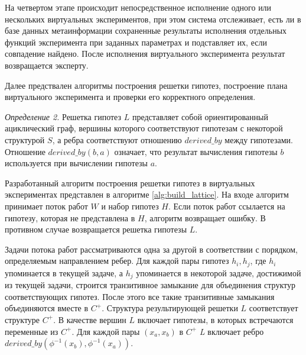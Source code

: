 На четвертом этапе происходит непосредственное исполнение одного или нескольких виртуальных экспериментов, при этом 
система отслеживает, есть ли в базе данных метаинформации сохраненные результаты исполнения отдельных функций 
эксперимента при заданных параметрах и подставляет их, если совпадение найдено. После исполнения виртуального 
эксперимента результат возвращается эксперту. 

Далее предствален алгоритмы построения решетки гипотез, построение плана виртуального эксперимента и 
проверки его корректного определения. 

\textit{Определение 2.} Решетка гипотез $L$ представляет собой ориентированный ациклический граф, вершины которого 
соответствуют гипотезам с некоторой структурой $S$, а ребра соответствуют отношению $derived\_by$  между гипотезами. 
Отношение $derived\_ by\left(b, a\right)$ означает, что результат вычисления гипотезы $b$ используется при вычислении 
гипотезы $a$.

Разработанный алгоритм построения решетки гипотез в виртуальных экспериментах представлен в алгоритме
\ref{alg:build_lattice}. На входе алгоритм принимает поток работ $W$ и набор гипотез $H$. 
Если поток работ ссылается на гипотезу, которая не представлена в $H$, алгоритм возвращает ошибку. 
В противном случае возвращается решетка гипотезы $L$.  

Задачи потока работ рассматриваются одна за другой в соответствии с порядком, определяемым направлением ребер. 
Для каждой пары гипотез $h_i, h_j$, где $h_i$ упоминается в текущей задаче, а $h_j$ упоминается в некоторой задаче, 
достижимой из текущей задачи, строится транзитивное замыкание для объединения структур соответствующих гипотез. 
После этого все такие транзитивные замыкания объединяются вместе в $C^+$. Структура результирующей решетки $L$ 
соответствует структуре $C^+$. В качестве вершин $L$ включает гипотезы, в которых встречаются переменные из $C^+$. 
Для каждой пары $\left(x_a, x_b\right)$ в $C^+$ \textit{L} включает ребро 
$derived\_by \left(\phi^{-1}\left(x_b\right), \phi^{-1}\left(x_a\right)\right)$.

